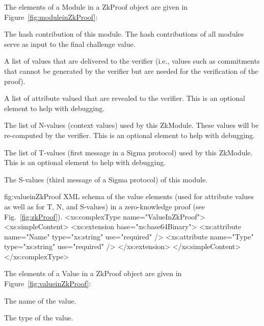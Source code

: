 \vspace{3pt}\noindent The elements of a Module in a ZkProof object are given in Figure~\ref{fig:moduleinZkProof}:
\begin{parameter}
The hash contribution of this module. The hash contributions of all modules serve as input to the 
final challenge value.
\end{parameter}
\begin{parameter}
A list of values that are delivered to the verifier (i.e., values such as commitments that cannot be generated
by the verifier but are needed for the verification of the proof).
\end{parameter}
\begin{parameter}
A list of attribute valued that are revealed to the verifier. This is an optional element to help with debugging.
\end{parameter}
\begin{parameter}
The list of N-values (context values) used by this ZkModule. These values will be re-computed by the verifier.
This is an optional element to help with debugging.
\end{parameter}
\begin{parameter}
The list of T-values (first message in a Sigma protocol) used by this ZkModule. This is an optional
element to help with debugging.
\end{parameter}
\begin{parameter}
The S-values (third message of a Sigma protocol) of this module.
\end{parameter}


\begin{xml}
{fig:valueinZkProof}
{XML schema of the value elements (used for attribute values as well as for T, N, and S-values) in a 
zero-knowledge proof (see Fig.~\ref{fig:zkProof}).}
<xs:complexType name="ValueInZkProof">
  <xs:simpleContent>
    <xs:extension base="xs:base64Binary">
      <xs:attribute name="Name" type="xs:string" use="required" />
      <xs:attribute name="Type" type="xs:string" use="required" />
    </xs:extension>
  </xs:simpleContent>
</xs:complexType>
\end{xml}

\vspace{3pt}\noindent The elements of a Value in a ZkProof object are given in Figure~\ref{fig:valueinZkProof}:
\begin{parameter}
The name of the value.
\end{parameter}
\begin{parameter}
The type of the value.
\end{parameter}

